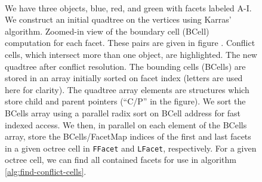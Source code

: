 \documentclass[submission]{gmp2017}
\begin{document}
\begin{figure}
 \\
       \hfill
       \hfill
       \hfill
  \caption{
    \protect{} We have three objects, blue, red, and green with facets labeled A-I.
    \protect{} We construct an initial quadtree on the vertices using Karras' algorithm.
    \protect{} Zoomed-in view of the boundary cell (BCell) computation for each facet. These pairs are given in figure \protect{}.
    \protect{} Conflict cells, which intersect more than one object, are highlighted.
    \protect{} The new quadtree after conflict resolution.
    \protect{} The bounding cells (BCells) are stored in an array initially sorted on facet index (letters are used here for clarity). The quadtree array elements are structures which store child and parent pointers (``C/P'' in the figure).
    \protect{} We sort the BCells array using a parallel radix sort on BCell address for fast indexed access. We then, in parallel on each element of the BCells array, store the BCells/FacetMap indices of the first and last facets in a given octree cell in \texttt{FFacet} and \texttt{LFacet}, respectively.
\protect{} For a given octree cell, we can find all contained facets for use in algorithm \ref{alg:find-conflict-cells}.
  }
  \label{fig:conflict-find}
\end{figure}

\begin{figure}
  \label{fig:scc-sort}
\end{figure}
\end{document}
